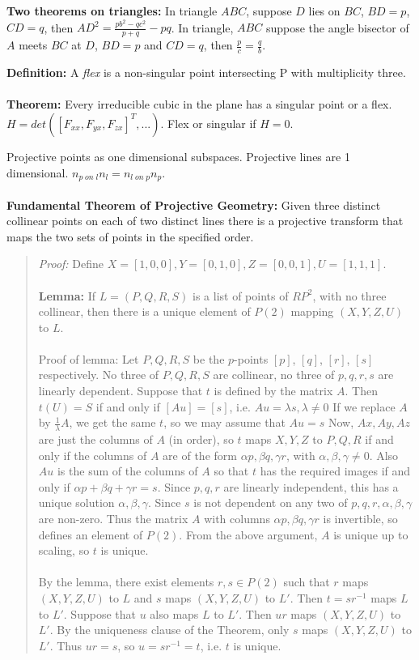 {\bf Two theorems on triangles:} In triangle $ABC$, suppose $D$ lies on $BC$, $BD=p$,
$CD=q$, then $AD^2= {\frac {pb^2-qc^2} {p+q}} - pq$.  In triangle, $ABC$ suppose the
angle bisector of $A$ meets $BC$ at $D$, $BD=p$ and $CD=q$, then ${\frac {p}{c}}= {\frac {q}{b}}$.
\begin{quote}
\end{quote}
{\bf Definition:}
A \emph{flex} is a non-singular point intersecting P with multiplicity three.  
\\
\\
{\bf Theorem:}  Every irreducible cubic
in the plane has a singular point or a flex.  $H= det([F_{xx}, F_{yx}, F_{zx}]^T, ...)$.
Flex or singular if $H=0$.
\begin{quote}
\end{quote}
Projective points as one dimensional subspaces.  Projective lines are 1 dimensional.
$n_{p \; on \; l} n_l= n_{l \; on \; p} n_p$.
\\
\\
{\bf Fundamental Theorem of Projective Geometry:}  Given three distinct collinear points on each of 
two distinct lines there is a projective transform 
that maps the two sets of points in the specified order.
\begin{quote}
\emph{Proof:}
Define $X = [1,0,0], Y = [0,1,0], Z = [0,0,1], U = [1,1,1]$.
\\
\\
{\bf Lemma:}
If $L =(P,Q,R,S)$ is a list of points of $RP^2$, with no three collinear, then 
there is a unique element of $P(2)$ mapping $(X,Y,Z,U)$ to $L$.
\\
\\
Proof of lemma: Let $P, Q, R, S$ be the $p$-points $[p]$, $[q]$, $[r]$, $[s]$ respectively.
No three of $P,Q,R,S$ are collinear, no three of $p,q,r,s$ are linearly dependent.
Suppose that $t$ is defined by the matrix $A$. 
Then $t(U) = S$ if and only if $[Au] = [s]$, i.e. $Au = \lambda s, \lambda \ne 0$ 
If we replace $A$ by ${\frac 1 {\lambda}}A$, we get the same $t$, so we may assume that $Au = s$
Now, $Ax, Ay, Az$ are just the columns of $A$ (in order), so
$t$ maps $X, Y, Z$ to $P, Q, R$ if and only if the columns of $A$ are 
of the form $\alpha p, \beta q, \gamma r$, with $\alpha, \beta, \gamma \ne 0$.
Also $Au$ is the sum of the columns of $A$ so that $t$ has the required images 
if and only if $\alpha p + \beta q + \gamma r = s$.
Since $p, q, r$ are linearly independent, this has a unique solution $\alpha, \beta, \gamma$.
Since $s$ is not dependent on any two of $p, q, r, \alpha, \beta, \gamma$  are non-zero.
Thus the matrix $A$ with columns $\alpha p, \beta q, \gamma r$ is invertible, so defines an element 
of $P(2)$. From the above argument, $A$ is unique up to scaling, so $t$ is unique.
\\
\\
By the lemma, there exist elements $r, s \in  P(2) $
such that $r$ maps $(X,Y,Z,U)$ to $L$ and $s$ maps $(X,Y,Z,U)$ to $L'$.
Then $t = sr^{-1}$ maps $L$ to $L'$.
Suppose that $u$ also maps $L$ to $L'$. Then $ur$ maps $(X,Y,Z,U)$ to $L'$.
By the uniqueness clause of the Theorem, only $s$ maps $(X,Y,Z,U)$ to $L'$.
Thus $ur = s$, so $u = sr^{-1} = t$, i.e. $t$ is unique.
\end{quote}
